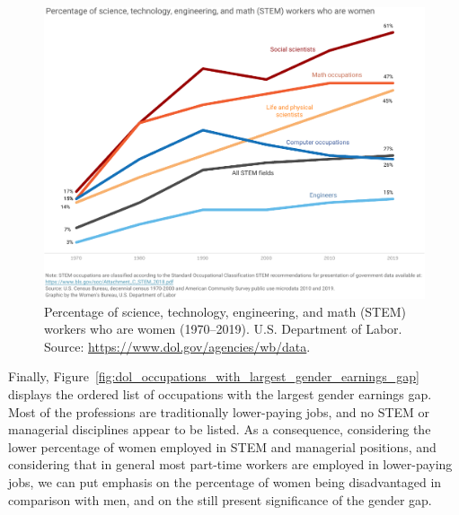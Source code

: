 \begin{figure}[t!]
\includegraphics[scale=.7]{figures/dol_stem_percent_women.pdf}
\centering
\caption{Percentage of science, technology, engineering, and math (STEM) workers who are women (1970--2019).\newline
U.S. Department of Labor. Source: \upshape\protect\url{https://www.dol.gov/agencies/wb/data}.}
\label{fig:dol_stem_percent_women}
\end{figure}

Finally, Figure~\ref{fig:dol_occupations_with_largest_gender_earnings_gap} displays the ordered list of occupations with the largest gender earnings gap. Most of the professions are traditionally lower-paying jobs, and no STEM or managerial disciplines appear to be listed. As a consequence, considering the lower percentage of women employed in STEM and managerial positions, and considering that in general most part-time workers are employed in lower-paying jobs, we can put emphasis on the percentage of women being disadvantaged in comparison with men, and on the still present significance of the gender gap.

